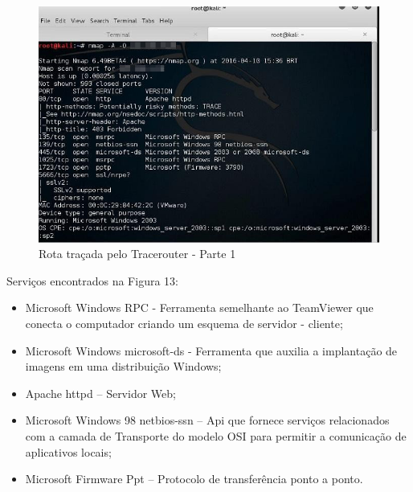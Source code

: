 \documentclass[
    12pt,               %
    openright,          %
    oneside,            %
    a4paper,            %
    section=TITLE,     %
    english,            %
    french,             %
    spanish,            %
    brazil              %
    ]{abntex2}
\begin{document}
\begin{figure}[htp]
\centering
\caption{Rota traçada pelo Tracerouter - Parte 1}
\includegraphics[width=450px]{image7.jpeg}
\end{figure}
\ifdefined\FloatBarrier \FloatBarrier \fi


Serviços encontrados na Figura 13:



\begin{itemize}
	
\item Microsoft Windows RPC - Ferramenta semelhante ao TeamViewer que conecta o computador criando um esquema de servidor - cliente;
	
\item Microsoft Windows microsoft-ds - Ferramenta que auxilia a implantação de imagens em uma distribuição Windows;
	
\item Apache httpd -- Servidor Web;
	
\item Microsoft Windows 98 netbios-ssn -- Api que fornece serviços relacionados com a camada de Transporte do modelo OSI para permitir a comunicação de aplicativos locais;
	
\item Microsoft Firmware Ppt -- Protocolo de transferência ponto a ponto.

\end{itemize}
\end{document}
